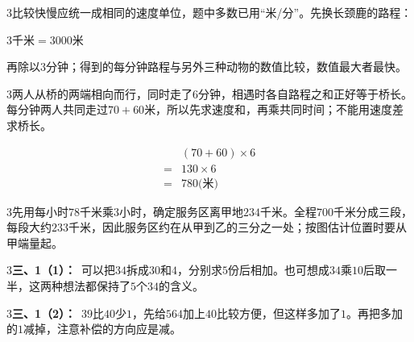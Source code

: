 \documentclass[multi=snippet,border={5bp 20bp 5bp 5bp}]{standalone}
\newenvironment{snippet}[3]{\begin{minipage}{#1bp}\color{answerred}\fontsize{#2}{#3}\selectfont\raggedright}{\end{minipage}}
\begin{document}
\begin{snippet}{505}{11.5}{14}\begin{multicols}{3}\raggedcolumns 比较快慢应统一成相同的速度单位，题中多数已用“米/分”。先换长颈鹿的路程：\par\noindent\(\displaystyle 3\text{千米}=3000\text{米}\)\allowbreak \par 再除以\(3\)\allowbreak 分钟；得到的每分钟路程与另外三种动物的数值比较，数值最大者最快。\end{multicols}\end{snippet}
\begin{snippet}{505}{11.5}{14}\begin{multicols}{3}\raggedcolumns 两人从桥的两端相向而行，同时走了\(6\)\allowbreak 分钟，相遇时各自路程之和正好等于桥长。每分钟两人共同走过\(70+60\)\allowbreak 米，所以先求速度和，再乘共同时间；不能用速度差求桥长。\par \[\begin{aligned}&(70+60)\times6\\={}&130\times6\\={}&780\text{(米)}\end{aligned}\]\end{multicols}\end{snippet}
\begin{snippet}{505}{11.5}{14}\begin{multicols}{3}\raggedcolumns 先用每小时\(78\)\allowbreak 千米乘\(3\)\allowbreak 小时，确定服务区离甲地\(234\)\allowbreak 千米。全程\(700\)\allowbreak 千米分成三段，每段大约\(233\)\allowbreak 千米，因此服务区约在从甲到乙的三分之一处；按图估计位置时要从甲端量起。\end{multicols}\end{snippet}
\begin{snippet}{505}{11.5}{14}\begin{multicols}{3}\raggedcolumns \textbf{三、1（1）：}\ 可以把\(34\)\allowbreak 拆成\(30\)\allowbreak 和\(4\)\allowbreak ，分别求\(5\)\allowbreak 份后相加。也可想成\(34\)\allowbreak 乘\(10\)\allowbreak 后取一半，这两种想法都保持了\(5\)\allowbreak 个\(34\)\allowbreak 的含义。\end{multicols}\end{snippet}
\begin{snippet}{505}{11.5}{14}\begin{multicols}{3}\raggedcolumns \textbf{三、1（2）：}\ \(39\)\allowbreak 比\(40\)\allowbreak 少\(1\)\allowbreak ，先给\(564\)\allowbreak 加上\(40\)\allowbreak 比较方便，但这样多加了\(1\)\allowbreak 。再把多加的\(1\)\allowbreak 减掉，注意补偿的方向应是减。\end{multicols}\end{snippet}
\end{document}
